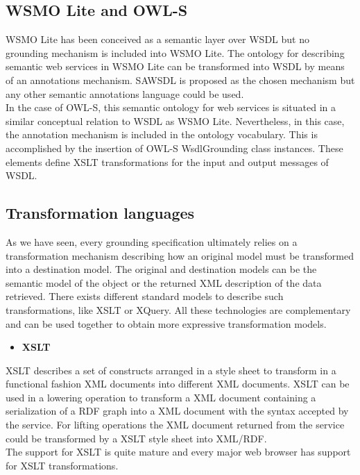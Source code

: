 \subsection{WSMO Lite and OWL-S}
WSMO Lite \cite{wsmolite} has been conceived as a semantic layer over WSDL but no grounding mechanism is included into WSMO Lite. The ontology for describing semantic web services in WSMO Lite can be transformed into WSDL by means of an annotations mechanism. SAWSDL is proposed as the chosen mechanism but any other semantic annotations language could be used.\\
In the case of OWL-S, this semantic ontology for web services is situated in a similar conceptual relation to WSDL as WSMO Lite. Nevertheless, in this case, the annotation mechanism is included in the ontology vocabulary. This is accomplished by the insertion of OWL-S WsdlGrounding class instances. These elements define XSLT transformations for the input and output messages of WSDL.

\subsection{Transformation languages}
As we have seen, every grounding specification ultimately relies on a transformation mechanism describing how an original model must be transformed into a destination model. The original and destination models can be the semantic model of the object or the returned XML description of the data retrieved. There exists different standard models to describe such transformations, like XSLT or XQuery. All these technologies are complementary and can be used together to obtain more expressive transformation models.

\begin{itemize}
\item \bf{XSLT}
\end{itemize}

XSLT \cite{xslt} describes a set of constructs arranged in a style sheet to transform in a functional fashion XML documents into different XML documents. XSLT can be used in a lowering operation to transform a XML document containing a serialization of a RDF graph into a XML document with the syntax accepted by the service. For lifting operations the XML document returned from the service could be transformed by a XSLT style sheet into XML/RDF.\\
The support for XSLT is quite mature and every major web browser has support for XSLT transformations.

